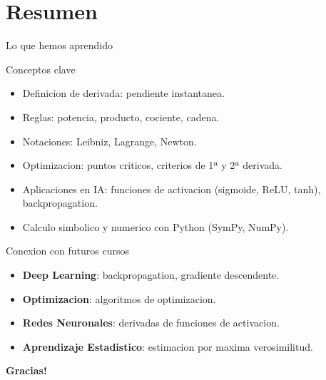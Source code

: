 \documentclass[aspectratio=169, 10pt, xcolor=table]{beamer}
\begin{document}
\section{Resumen}

\begin{frame}{Lo que hemos aprendido}
    \begin{exampleblock}{Conceptos clave}
        \begin{itemize}
            \item Definicion de derivada: pendiente instantanea.
            \item Reglas: potencia, producto, cociente, cadena.
            \item Notaciones: Leibniz, Lagrange, Newton.
            \item Optimizacion: puntos criticos, criterios de 1ª y 2ª derivada.
            \item Aplicaciones en IA: funciones de activacion (sigmoide, ReLU, tanh), backpropagation.
            \item Calculo simbolico y numerico con Python (SymPy, NumPy).
        \end{itemize}
    \end{exampleblock}
\end{frame}

\begin{frame}{Conexion con futuros cursos}
    \begin{itemize}
        \item \textbf{Deep Learning}: backpropagation, gradiente descendente.
        \item \textbf{Optimizacion}: algoritmos de optimizacion.
        \item \textbf{Redes Neuronales}: derivadas de funciones de activacion.
        \item \textbf{Aprendizaje Estadistico}: estimacion por maxima verosimilitud.
    \end{itemize}
\end{frame}

\begin{frame}
    \centering
    \Huge \textbf{Gracias!}

\end{frame}
\end{document}
